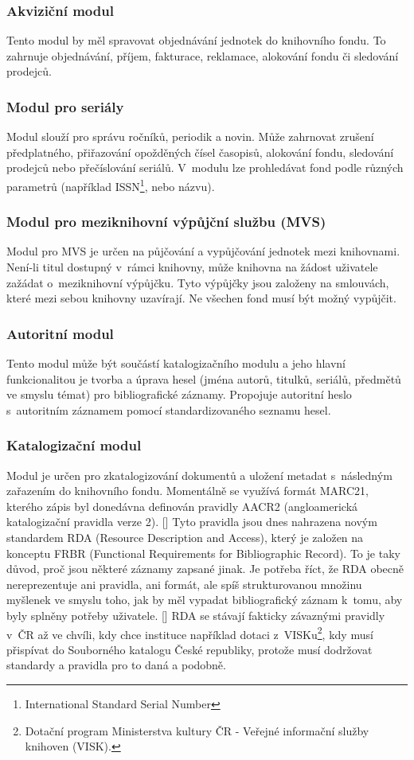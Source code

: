 \documentclass[
	11pt, oneside, printed, final, palatino, monochrome
	microtype,
	table,   %
	lof,     %
	lot     %
]{fithesis3}
\newcommand{\citepages}[2]{[\cite[#1]{#2}]}
\begin{document}
{\subsubsection{Akviziční modul}
Tento modul by měl spravovat objednávání jednotek do knihovního fondu. To zahrnuje objednávání, příjem, fakturace, reklamace, alokování fondu či sledování prodejců. 

\subsubsection{Modul pro seriály}
Modul slouží pro správu ročníků, periodik a novin. Může zahrnovat zrušení předplatného, přiřazování opožděných čísel časopisů, alokování fondu, sledování prodejců nebo přečíslování seriálů. V~modulu lze prohledávat fond podle různých parametrů (například ISSN\footnote{International Standard Serial Number}, nebo názvu).

\subsubsection{Modul pro meziknihovní výpůjční službu (MVS)}
Modul pro MVS je určen na půjčování a vypůjčování jednotek mezi knihovnami. Není-li titul dostupný v~rámci knihovny, může knihovna na žádost uživatele zažádat o~meziknihovní výpůjčku. Tyto výpůjčky jsou založeny na smlouvách, které mezi sebou knihovny uzavírají. Ne všechen fond musí být možný vypůjčit.

\subsubsection{Autoritní modul}
Tento modul může být součástí katalogizačního modulu a jeho hlavní funkcionalitou je tvorba a úprava hesel (jména autorů, titulků, seriálů, předmětů ve smyslu témat) pro bibliografické záznamy. Propojuje autoritní heslo s~autoritním záznamem pomocí standardizovaného seznamu hesel.

\subsubsection{Katalogizační modul}
Modul je určen pro zkatalogizování dokumentů a uložení metadat s~následným zařazením do knihovního fondu. Momentálně se využívá formát MARC21, kterého zápis byl donedávna definován pravidly AACR2 (angloamerická katalogizační pravidla verze 2). \citepages{26-27}{dilhofova_kratochvilova_lidmila_2013} Tyto pravidla jsou dnes nahrazena novým standardem RDA (Resource Description and Access), který je založen na konceptu FRBR (Functional Requirements for Bibliographic Record). To je taky důvod, proč jsou některé záznamy zapsané jinak. Je potřeba říct, že RDA obecně nereprezentuje ani pravidla, ani formát, ale spíš strukturovanou množinu myšlenek ve smyslu toho, jak by měl vypadat bibliografický záznam k~tomu, aby byly splněny potřeby uživatele. \citepages{8}{bilal_c2014}
RDA se stávají fakticky závaznými pravidly v~ČR až ve chvíli, kdy chce instituce například dotaci z~VISKu\footnote{Dotační program Ministerstva kultury ČR - Veřejné informační služby knihoven (VISK).}, kdy musí přispívat do Souborného katalogu České republiky, protože musí dodržovat standardy a pravidla pro to daná a podobně.

}
\end{document}
